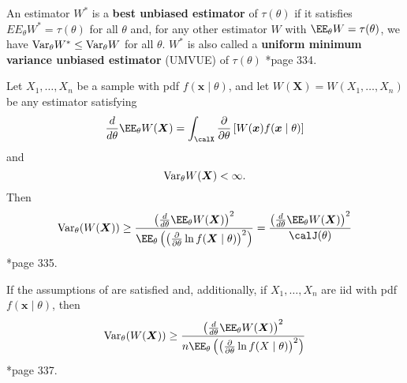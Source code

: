 \begin{defe} \label{defe: umvu}
    An estimator $W^{\ast}$ is a {\bf best unbiased estimator} of $\tau (\theta)$ if it satisfies $EE_{\theta} W^{\ast} = \tau (\theta)$ for all $\theta$ and, for any other estimator $W$ with $\EE_{\theta} W = \tau (\theta)$, we have ${\operatorname{Var}}_{\theta} W^{\ast} \leq {\operatorname{Var}}_{\theta} W$ for all $\theta$. $W^{\ast}$ is also called a {\bf uniform minimum variance unbiased estimator} (UMVUE) of $\tau (\theta)$ \cite{CasellaGeorge2001SI}*{page 334}.
\end{defe}

\begin{thm} \label{thm: cri_neq}
    Let $X_1 , \ldots , X_n$ be a sample with pdf $f(\bm{x} \mid \theta)$, and let $W(\bm{X}) = W(X_1 , \ldots , X_n)$ be any estimator satisfying
    \begin{equation*}
        \frac{d}{d \theta} \EE_{\theta} W(\bm{X}) = \int_{\calX} \frac{\partial}{\partial \theta} \left[ W(\bm{x}) f(\bm{x} \mid \theta) \right]
    \end{equation*}
    and
    \begin{equation*}
        {\operatorname{Var}}_{\theta} W(\bm{X}) < \infty.
    \end{equation*}
    Then
    \begin{equation*}
        \Var_{\theta} (W(\bm{X})) \geq \frac{\left( \frac{d}{d \theta} \EE_{\theta} W(\bm{X}) \right)^2}{\EE_{\theta} \left( \left( \frac{\partial}{\partial \theta} \ln f(\bm{X} \mid \theta)  \right)^2 \right)} = \frac{\left( \frac{d}{d \theta} \EE_{\theta} W(\bm{X}) \right)^2}{\calJ (\theta)}
    \end{equation*}
    \cite{CasellaGeorge2001SI}*{page 335}.
\end{thm}

\begin{cor} \label{cor: cri_neq_iid}
    If the assumptions of  are satisfied and, additionally, if $X_1 , \ldots , X_n$ are iid with pdf $f(\bm{x} \mid \theta)$, then
    \begin{equation*}
        \Var_{\theta} (W(\bm{X})) \geq \frac{\left( \frac{d}{d \theta} \EE_{\theta} W(\bm{X}) \right)^2}{n \EE_{\theta} \left( \left( \frac{\partial}{\partial \theta} \ln f(X \mid \theta)  \right)^2 \right)}
    \end{equation*}
    \cite{CasellaGeorge2001SI}*{page 337}.
\end{cor}

